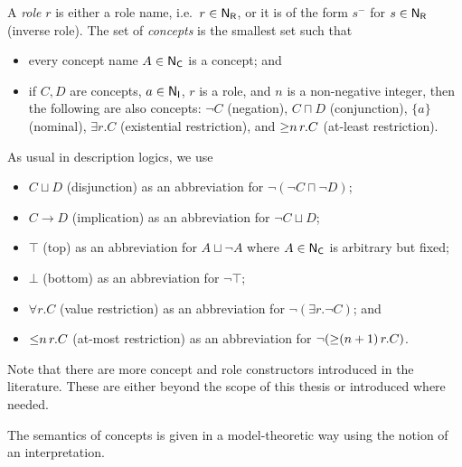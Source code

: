 \begin{definition}
    A \emph{role} $r$ is either a role name, i.e.~$r\in\mathsf{N_R}$, or it is of the
    form $s^-$ for $s\in\mathsf{N_R}$ (inverse role).
    The set of \emph{concepts} is the smallest set such that
    \begin{itemize}
        \item every concept name $A\in\mathsf{N_C}$ is a concept; and
        \item if $C,D$ are concepts, $a\in\mathsf{N_I}$, $r$ is a role, and $n$ is a
            non-negative integer, then the following are also concepts: $\lnot
            C$ (negation), $C\sqcap D$ (conjunction), $\{a\}$ (nominal),
            $\exists r.C$ (existential restriction), and ${\ge}n\,r.C$
            (at-least restriction).
    \end{itemize}
\end{definition}

\noindent
As usual in description logics, we use
\begin{itemize}
    \item $C\sqcup D$ (disjunction) as an abbreviation for $\lnot(\lnot
        C\sqcap\lnot D)$;
    \item $C\to D$ (implication) as an abbreviation for $\lnot C\sqcup D$;
    \item $\top$ (top) as an abbreviation for $A\sqcup\lnot A$ where $A\in\mathsf{N_C}$
        is arbitrary but fixed;
    \item $\bot$ (bottom) as an abbreviation for $\lnot\top$;
    \item $\forall r.C$ (value restriction) as an abbreviation for
        $\lnot(\exists r.\lnot C)$; and
    \item ${\le}n\,r.C$ (at-most restriction) as an abbreviation for
        $\lnot({\ge}(n+1)\,r.C)$.
\end{itemize}

Note that there are more concept and role constructors introduced in the
literature.  These are either beyond the scope of this thesis or introduced
where needed.

The semantics of concepts is given in a model-theoretic way using the notion of
an interpretation.

